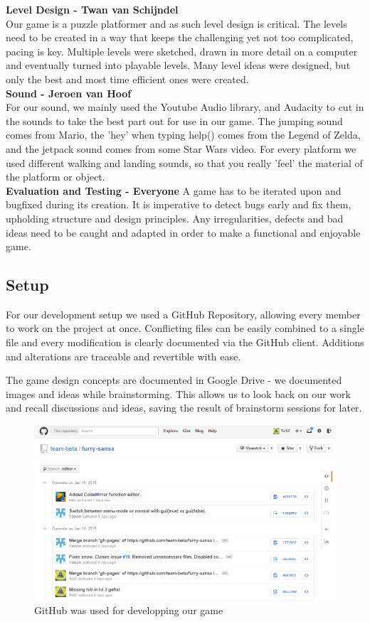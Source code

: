 \documentclass[a4paper,twoside,12pt]{article}
\begin{document}
\textbf{Level Design - Twan van Schijndel} \\
Our game is a puzzle platformer and as such level design is critical. The levels need to be created in a way that keeps the challenging yet not too complicated, pacing is key. Multiple levels were sketched, drawn in more detail on a computer and eventually turned into playable levels. Many level ideas were designed, but only the best and most time efficient ones were created. \\

\textbf{Sound - Jeroen van Hoof}\\
For our sound, we mainly used the Youtube Audio library, and Audacity to cut in the sounds to take the best part out for use in our game. The jumping sound comes from Mario, the 'hey' when typing help() comes from the Legend of Zelda, and the jetpack sound comes from some Star Wars video. For every platform we used different walking and landing sounds, so that you really 'feel' the material of the platform or object.\\

\textbf{Evaluation and Testing - Everyone}
A game has to be iterated upon and bugfixed during its creation. It is imperative to detect bugs early and fix them, upholding structure and design principles. Any irregularities, defects and bad ideas need to be caught and adapted in order to make a functional and enjoyable game.\\

\subsection{Setup}

For our development setup we used a GitHub Repository, allowing every member to work on the project at once. Conflicting files can be easily combined to a single file and every modification is clearly documented via the GitHub client. Additions and alterations are traceable and revertible with ease.

The game design concepts are documented in Google Drive - we documented images and ideas while brainstorming. This allows us to look back on our work and recall discussions and ideas, saving the result of brainstorm sessions for later.

\begin{figure}[H]
\centering
\includegraphics[scale=0.5]{github}
\caption{GitHub was used for developping our game}
\end{figure}
\end{document}
